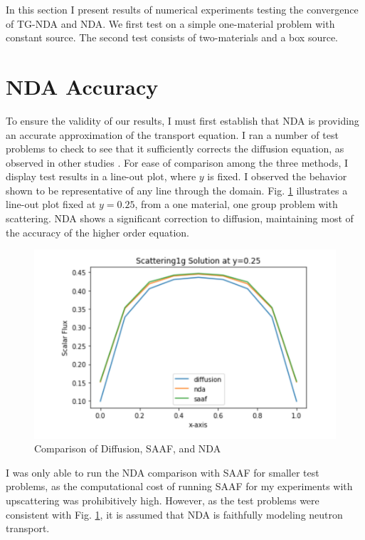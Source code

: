 In this section I present results of numerical experiments testing the convergence of TG-NDA and NDA. We first test on a simple one-material problem with constant source. The second test consists of two-materials and a box source. 

\section{NDA Accuracy}

To ensure the validity of our results, I must first establish that NDA is providing an accurate approximation of the transport equation. I ran a number of test problems to check to see that it sufficiently corrects the diffusion equation, as observed in other studies \cite{morel-holo, Wang2013}. For ease of comparison among the three methods, I display test results in a line-out plot, where $y$ is fixed. I observed the behavior shown to be representative of any line through the domain. Fig. \ref{fig:comparison} illustrates a line-out plot fixed at $y=0.25$, from a one material, one group problem with scattering. NDA shows a significant correction to diffusion, maintaining most of the accuracy of the higher order equation. 
\begin{figure}[H]
    \centering
    \includegraphics[width=.75\textwidth]{fig/LineOut25.png}
    \caption{Comparison of Diffusion, SAAF, and NDA}
    \label{fig:comparison}
\end{figure}

I was only able to run the NDA comparison with SAAF 
for smaller test problems, as the computational cost of running SAAF for my experiments with upscattering was prohibitively high.  However, as the test problems were consistent with Fig. \ref{fig:comparison}, it is assumed that NDA is faithfully modeling neutron transport. 

